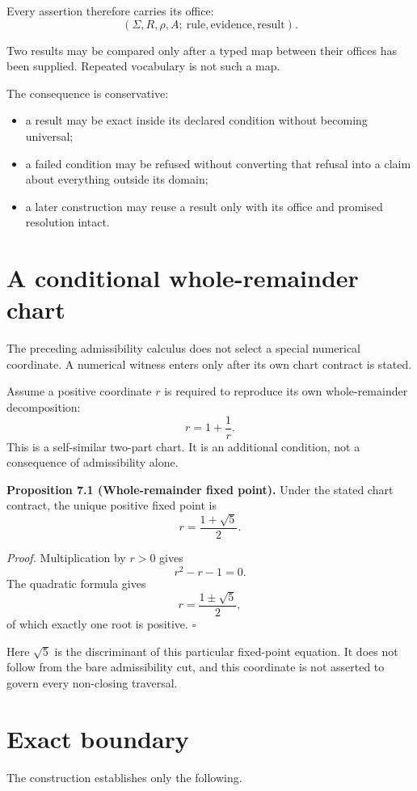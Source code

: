 \documentclass[11pt]{article}
\begin{document}
Every assertion therefore carries its office:
\[
(\Sigma,R,\rho,A;\ \text{rule},\text{evidence},\text{result}).
\]

Two results may be compared only after a typed map between their offices has been supplied. Repeated vocabulary is not such a map.

The consequence is conservative:
\begin{itemize}
\item a result may be exact inside its declared condition without becoming universal;
\item a failed condition may be refused without converting that refusal into a claim about everything outside its domain;
\item a later construction may reuse a result only with its office and promised resolution intact.
\end{itemize}

\section{A conditional whole-remainder chart}

The preceding admissibility calculus does not select a special numerical coordinate. A numerical witness enters only after its own chart contract is stated.

Assume a positive coordinate $r$ is required to reproduce its own whole-remainder decomposition:
\[
r=1+\frac1r.
\]
This is a self-similar two-part chart. It is an additional condition, not a consequence of admissibility alone.

\textbf{Proposition 7.1 (Whole-remainder fixed point).}
Under the stated chart contract, the unique positive fixed point is
\[
\boxed{r=\frac{1+\sqrt5}{2}}.
\]

\textit{Proof.}
Multiplication by $r>0$ gives
\[
r^2-r-1=0.
\]
The quadratic formula gives
\[
r=\frac{1\pm\sqrt5}{2},
\]
of which exactly one root is positive. \hfill$\square$

Here $\sqrt5$ is the discriminant of this particular fixed-point equation. It does not follow from the bare admissibility cut, and this coordinate is not asserted to govern every non-closing traversal.

\section{Exact boundary}

The construction establishes only the following.
\end{document}
